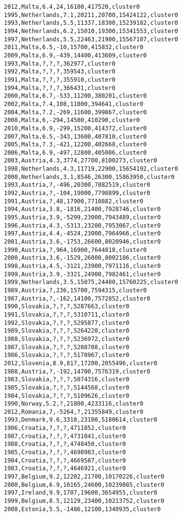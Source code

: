 \begin{lstlisting}[basicstyle=\footnotesize\ttfamily,numbers=none]
2012,Malta,6.4,24,16100,417520,cluster0
1995,Netherlands,7.1,20211,20700,15424122,cluster0
1993,Netherlands,5.5,11337,18300,15239182,cluster0
1994,Netherlands,6.2,15010,19300,15341553,cluster0
1997,Netherlands,5.5,22463,21900,15567107,cluster0
2011,Malta,6.5,-10,15700,415832,cluster0
2009,Malta,6.9,-439,14400,413609,cluster0
1993,Malta,?,?,?,362977,cluster0
1992,Malta,?,?,?,359543,cluster0
1991,Malta,?,?,?,355910,cluster0
1994,Malta,?,?,?,366431,cluster0
2000,Malta,6.7,-533,11200,380201,cluster0
2002,Malta,7.4,108,11800,394641,cluster0
2004,Malta,7.2,-269,11600,399867,cluster0
2008,Malta,6,-294,14500,410290,cluster0
2010,Malta,6.9,-299,15200,414372,cluster0
2007,Malta,6.5,-343,13600,407810,cluster0
2005,Malta,7.3,-421,12200,402668,cluster0
2006,Malta,6.9,-497,12800,405006,cluster0
2003,Austria,4.3,3774,27700,8100273,cluster0
1998,Netherlands,4.3,11719,22900,15654192,cluster0
2000,Netherlands,3.1,8546,26300,15863950,cluster0
1993,Austria,?,-496,20300,7882519,cluster0
1992,Austria,?,-104,19000,7798899,cluster0
1991,Austria,?,48,17900,7710882,cluster0
1994,Austria,3.8,-1816,21400,7928746,cluster0
1995,Austria,3.9,-5299,23000,7943489,cluster0
1996,Austria,4.3,-5313,23200,7953067,cluster0
1997,Austria,4.4,-4524,23000,7964966,cluster0
2001,Austria,3.6,-1753,26600,8020946,cluster0
1990,Austria,?,964,16900,7644818,cluster0
2000,Austria,3.6,-1529,26000,8002186,cluster0
1998,Austria,4.5,-3121,23900,7971116,cluster0
1999,Austria,3.9,-3321,24900,7982461,cluster0
1999,Netherlands,3.5,15075,24400,15760225,cluster0
1989,Austria,?,236,15700,7594315,cluster0
1987,Austria,?,-162,14100,7572852,cluster0
1990,Slovakia,?,?,?,5287663,cluster0
1991,Slovakia,?,?,?,5310711,cluster0
1992,Slovakia,?,?,?,5295877,cluster0
1989,Slovakia,?,?,?,5264220,cluster0
1988,Slovakia,?,?,?,5236972,cluster0
1987,Slovakia,?,?,?,5208708,cluster0
1986,Slovakia,?,?,?,5178967,cluster0
2012,Slovenia,8.9,817,17200,2055496,cluster0
1988,Austria,?,-192,14700,7576319,cluster0
1983,Slovakia,?,?,?,5074316,cluster0
1985,Slovakia,?,?,?,5144568,cluster0
1984,Slovakia,?,?,?,5109626,cluster0
1990,Norway,5.2,?,21800,4233116,cluster0
2012,Romania,7,-5264,?,21355849,cluster0
1993,Denmark,9.6,3310,23100,5180614,cluster0
1986,Croatia,?,?,?,4711852,cluster0
1987,Croatia,?,?,?,4731041,cluster0
1988,Croatia,?,?,?,4748450,cluster0
1985,Croatia,?,?,?,4690983,cluster0
1984,Croatia,?,?,?,4669587,cluster0
1983,Croatia,?,?,?,4646921,cluster0
1997,Belgium,9.2,12202,21700,10170226,cluster0
2000,Belgium,6.9,10165,24600,10239085,cluster0
1997,Ireland,9.9,1707,19600,3654955,cluster0
1999,Belgium,8.5,12129,23400,10213752,cluster0
2008,Estonia,5.5,-1486,12100,1340935,cluster0

\end{lstlisting}
